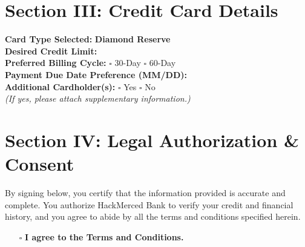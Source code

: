 \documentclass[12pt,a4paper]{article}
\begin{document}
\section*{Section III: Credit Card Details}
\noindent\textbf{Card Type Selected:} \textbf{Diamond Reserve}\\[1ex]
\textbf{Desired Credit Limit:} \\[2ex]
\textbf{Preferred Billing Cycle:} \hspace{0.5cm} $\square$ 30-Day \hspace{1cm} $\square$ 60-Day\\[2ex]
\textbf{Payment Due Date Preference (MM/DD):} \\[2ex]
\textbf{Additional Cardholder(s):} \hspace{0.5cm} $\square$ Yes \hspace{1cm} $\square$ No\\[1ex]
\textit{(If yes, please attach supplementary information.)}

\section*{Section IV: Legal Authorization \& Consent}
\noindent By signing below, you certify that the information provided is accurate and complete. You authorize HackMerced Bank to verify your credit and financial history, and you agree to abide by all the terms and conditions specified herein.
\begin{itemize}[leftmargin=1.5cm]
    \item[$\square$] \textbf{I agree to the Terms and Conditions.}
\end{itemize}

\newpage
\end{document}
